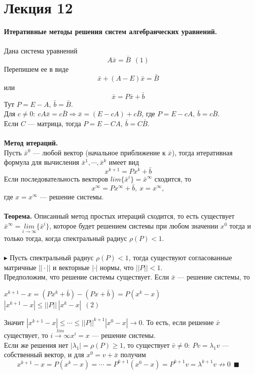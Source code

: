 \documentclass[12pt]{article}
\theoremstyle{definition}
\numberwithin{equation}{section}
\begin{document}
	\section *{Лекция 12}
	\noindent\textbf{Итеративные методы решения систем алгебраических уравнений.}\\ \\
	Дана система уравнений $$A\bar x=\bar B~~(1)$$
	Перепишем ее в виде $$\bar x+(A-E)\bar x=\bar B$$
	или $$\bar x=P\bar x+\bar b$$
	Тут $P=E-A,~\bar b=\bar B$.\\
	Для $c\neq 0:~cA\bar x=c\bar B \Rightarrow \bar x=(E-cA)+c\bar B$, где $P=E-cA,~\bar b=c\bar B$.\\
	Если $C$ --- матрица, тогда $P=E-CA,~\bar b=C\bar B$.\\ \\
	\textbf{Метод итераций.}\\
	Пусть $\bar x^0$ --- любой вектор (начальное приближение к $\bar x$), тогда итеративная формула для вычисления $\bar x^1, \cdots, \bar x^k$ имеет вид
	$$x^{k+1}=Px^k+\bar b$$ 
	Если последовательность векторов $lim\{\bar x^i\}=\bar x^{\infty}$ сходится, то $$x^{\infty}=Px^{\infty}+\bar b,~x=x^{\infty},$$
	где $x=x^{\infty}$ --- решение системы.\\
	\\
	\textbf{Теорема.} Описанный метод простых итераций сходится, то есть существует $\bar x^{\infty}=\underset{i\to \infty}{lim}\{\bar x^i\}$, которое будет решением системы при любом значении $x^0$ тогда и только тогда, когда спектральный радиус $\rho(P)<1$.\\ \\
	$\blacktriangleright$ Пусть спектральный радиус $\rho(P)<1$, тогда существуют согласованные матричные $||\cdot||$ и векторные $|\cdot|$ нормы, что $||P||<1$.\\
	Предположим, что решение системы существует. Если $\bar x$ --- решение системы, то \begin{center}
		$x^{k+1}-x=(Px^k+\bar b)-(Px+\bar b)=P(x^k-x)$\\
		$|x^{k+1}-x|\leqslant||P||~|x^k-x|~~(2)$
	\end{center}
	Значит $|x^{k+1}-x|\leqslant \cdots \leqslant ||P||^{k+1}|x^0-x| \to 0$. То есть, если решение $\bar x$ существует, то $\overset{lim}{i\to \infty}x^i=x$ --- решение системы.\\
	Если же решения нет $|\lambda_1|=\rho(P)\geqslant 1$, то существует $\bar v\neq 0:~Pv=\lambda_1 v$ --- собственный вектор, и для $x^0=v+\bar x$ получим
	$$x^{k+1}-x=P(x^k-x)=\cdots=P^{k+1}(x^0-x)=P^{k+1}v=\lambda^{k+1}v \nrightarrow 0~~\blacksquare$$
\end{document}

